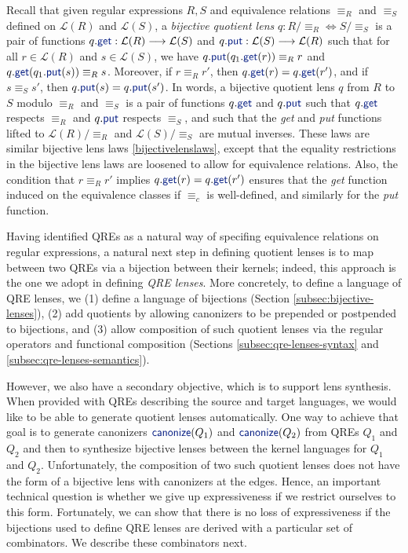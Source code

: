 \documentclass[acmsmall,review,anonymous]{acmart}
\newcommand{\kw}[1]{\textcolor{dkblue}{\ensuremath{\mathsf{#1}}}}
\newcommand{\canonize}{\ensuremath{\kw{canonize}}}
\newcommand{\get}{\ensuremath{\kw{get}}}
\newcommand{\lput}{\ensuremath{\kw{put}}}
\begin{document}
Recall that given regular expressions $R, S$ and equivalence relations
$\equiv_R$ and $\equiv_S$ defined on $\mathcal{L}(R)$ and $\mathcal{L}(S)$, a
{\em bijective quotient lens} $q : R /{\equiv_R} \Leftrightarrow S/{\equiv_S}$
is a pair of functions $q.\get : \mathcal{L}(R) \longrightarrow \mathcal{L}(S)$
and $q.\lput : \mathcal{L}(S) \longrightarrow \mathcal{L}(R)$ such that for all
$r \in \mathcal{L}(R)$ and $s \in \mathcal{L}(S)$, we have $q.\lput(q_1.\get(r))
\equiv_R r$ and $q.\get(q_1.\lput(s)) \equiv_R s$. Moreover, if $r \equiv_R
r'$, then $q.\get(r) = q.\get(r')$, and if $s \equiv_S s'$, then $q.\lput(s) =
q.\lput(s')$. In words, a bijective quotient lens $q$ from $R$ to $S$ modulo
$\equiv_R$ and $\equiv_S$ is a pair of functions $q.\get$ and $q.\lput$ such
that $q.\get$ respects $\equiv_R$ and $q.\lput$ respects $\equiv_S$, and such
that the {\em get} and {\em put} functions lifted to $\mathcal{L}(R)/{\equiv_R}$
and $\mathcal{L}(S)/{\equiv_S}$ are mutual inverses. These laws are similar
bijective lens laws \cref{bijectivelenslaws}, except that the equality
restrictions in the bijective lens laws are loosened to allow for equivalence
relations. Also, the condition that $r \equiv_R r'$ implies $q.\get(r) =
q.\get(r')$ ensures that the {\em get} function induced on the equivalence
classes if $\equiv_c$ is well-defined, and similarly for the {\em put}
function.

Having identified QREs as a natural way of specifing equivalence relations on
regular expressions, a natural next step in defining quotient lenses is to map
between two QREs via a bijection between their kernels; indeed, this approach
is the one we adopt in defining {\em QRE lenses}.
More concretely, to define a language of QRE lenses, we
(1) define a language of bijections (Section \ref{subsec:bijective-lenses}),
(2) add quotients by allowing canonizers to be prepended or postpended
to bijections, and 
(3) allow composition of such quotient lenses via the
regular operators and functional composition
(Sections \ref{subsec:qre-lenses-syntax} and \ref{subsec:qre-lenses-semantics}).

However, we also have a secondary objective, which is to support lens
synthesis. When provided with QREs describing the source and target
languages, we would like to be able to generate quotient lenses
automatically. One way to achieve that goal is to generate canonizers
$\canonize(Q_1)$ and $\canonize(Q_2)$ from QREs $Q_1$ and $Q_2$ and
then to synthesize bijective lenses between the kernel languages for
$Q_1$ and $Q_2$.
Unfortunately, the composition of two such quotient lenses does not have 
the form of a bijective lens with canonizers at the edges. Hence, an important
technical question is whether we give up expressiveness if we restrict
ourselves to this form. 
Fortunately, we can show that there is no loss of expressiveness if
the bijections used to define QRE lenses are derived with a particular
set of combinators.  We describe these combinators next.
\end{document}
